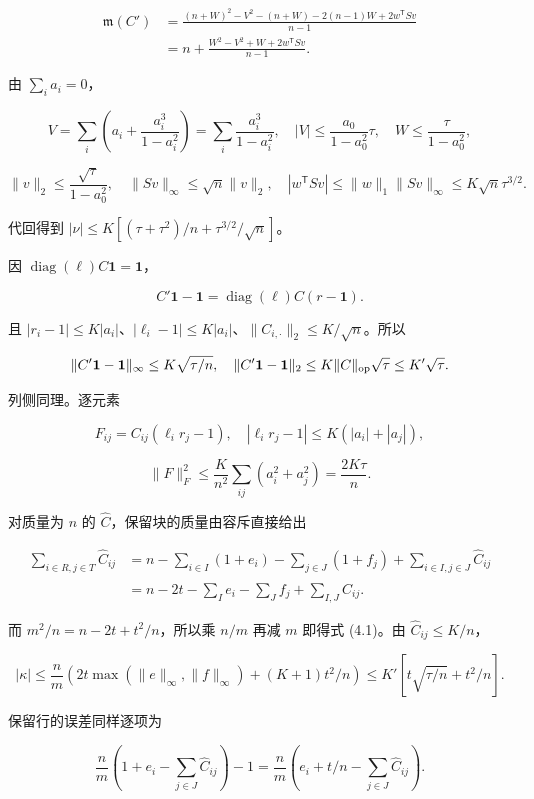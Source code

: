 \documentclass[11pt,a4paper]{article}
\begin{document}
\[\begin{aligned}
\mathfrak m(C')&=\frac{(n+W)^2-V^2-(n+W)-2(n-1)W+2w^{\mathsf T}Sv}{n-1}\\
&=n+\frac{W^2-V^2+W+2w^{\mathsf T}Sv}{n-1}.
\end{aligned}\]

由 \(\sum_i a_i=0\)，

\[V=\sum_i\left(a_i+\frac{a_i^3}{1-a_i^2}\right)
=\sum_i\frac{a_i^3}{1-a_i^2},\quad
|V|\le\frac{a_0}{1-a_0^2}\tau,
\quad W\le\frac\tau{1-a_0^2},\]

\[\|v\|_2\le\frac{\sqrt\tau}{1-a_0^2},\quad
\|Sv\|_\infty\le\sqrt n\|v\|_2,\quad
|w^{\mathsf T}Sv|\le\|w\|_1\|Sv\|_\infty\le K\sqrt n\tau^{3/2}.\]

代回得到 \(|\nu|\le K[(\tau+\tau^2)/n+\tau^{3/2}/\sqrt n]\)。

因 \(\operatorname{diag}(\ell)C\mathbf1=\mathbf1\)，

\[C'\mathbf1-\mathbf1=\operatorname{diag}(\ell)C(r-\mathbf1).\]

且 \(|r_i-1|\le K|a_i|\)、\(|\ell_i-1|\le K|a_i|\)、\(\|C_{i,\cdot}\|_2\le K/\sqrt n\)。所以

\[\|C'\mathbf1-\mathbf1\|_\infty\le K\sqrt{\tau/n},\quad
\|C'\mathbf1-\mathbf1\|_2\le K\|C\|_{\rm op}\sqrt\tau\le K'\sqrt\tau.\]

列侧同理。逐元素

\[F_{ij}=C_{ij}(\ell_ir_j-1),\quad
|\ell_ir_j-1|\le K(|a_i|+|a_j|),\]

\[\|F\|_F^2\le\frac K{n^2}\sum_{ij}(a_i^2+a_j^2)
=\frac{2K\tau}n.\]

对质量为 \(n\) 的 \(\widehat C\)，保留块的质量由容斥直接给出

\[\begin{aligned}
\sum_{i\in R,j\in T}\widehat C_{ij}
&=n-\sum_{i\in I}(1+e_i)-\sum_{j\in J}(1+f_j)
+\sum_{i\in I,j\in J}\widehat C_{ij}\\
&=n-2t-\sum_Ie_i-\sum_Jf_j+\sum_{I,J}\widehat C_{ij}.
\end{aligned}\]

而 \(m^2/n=n-2t+t^2/n\)，所以乘 \(n/m\) 再减 \(m\) 即得式 (4.1)。由 \(\widehat C_{ij}\le K/n\)，

\[|\kappa|\le\frac nm\left(2t\max(\|e\|_\infty,\|f\|_\infty)
+(K+1)t^2/n\right)
\le K'[t\sqrt{\tau/n}+t^2/n].\]

保留行的误差同样逐项为

\[\frac nm\left(1+e_i-\sum_{j\in J}\widehat C_{ij}\right)-1
=\frac nm\left(e_i+t/n-\sum_{j\in J}\widehat C_{ij}\right).\]
\end{document}
